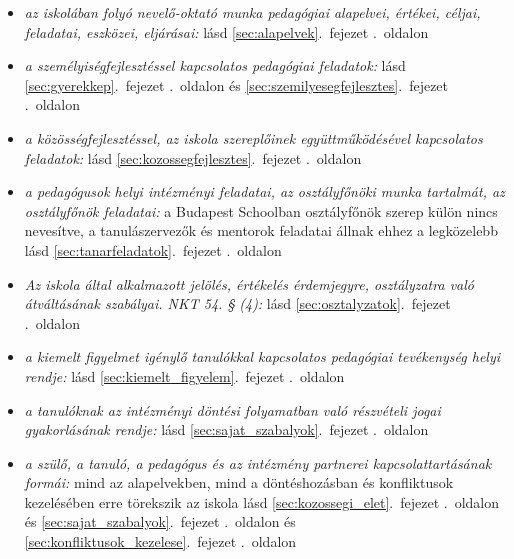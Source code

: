 \begin{itemize}
   

\item \emph{az iskolában folyó nevelő-oktató munka pedagógiai alapelvei, értékei, céljai, feladatai, eszközei, eljárásai: }    
       lásd        \ref{sec:alapelvek}.~fejezet .~oldalon
              
\item \emph{a személyiségfejlesztéssel kapcsolatos pedagógiai feladatok: }    
       lásd        \ref{sec:gyerekkep}.~fejezet .~oldalon és 
              \ref{sec:szemilyesegfejlesztes}.~fejezet .~oldalon
              
\item \emph{a közösségfejlesztéssel, az iskola szereplőinek együttműködésével kapcsolatos feladatok: }    
       lásd        \ref{sec:kozossegfejlesztes}.~fejezet .~oldalon
              
\item \emph{a pedagógusok helyi intézményi feladatai, az osztályfőnöki munka tartalmát, az osztályfőnök feladatai: }   a Budapest Schoolban osztályfőnök szerep külön nincs nevesítve, a tanulászervezők és mentorok feladatai állnak ehhez a legközelebb 
       lásd        \ref{sec:tanarfeladatok}.~fejezet .~oldalon
              
\item \emph{Az iskola által alkalmazott jelölés, értékelés érdemjegyre, osztályzatra való átváltásának szabályai. NKT 54. § (4): }    
       lásd        \ref{sec:osztalyzatok}.~fejezet .~oldalon
              
\item \emph{a kiemelt figyelmet igénylő tanulókkal kapcsolatos pedagógiai tevékenység helyi rendje: }    
       lásd        \ref{sec:kiemelt_figyelem}.~fejezet .~oldalon
              
\item \emph{a tanulóknak az intézményi döntési folyamatban való részvételi jogai gyakorlásának rendje: }    
       lásd        \ref{sec:sajat_szabalyok}.~fejezet .~oldalon
              
\item \emph{a szülő, a tanuló, a pedagógus és az intézmény partnerei kapcsolattartásának formái: }   mind az alapelvekben, mind a döntéshozásban és konfliktusok kezelésében erre törekszik az iskola 
       lásd        \ref{sec:kozossegi_elet}.~fejezet .~oldalon és 
              \ref{sec:sajat_szabalyok}.~fejezet .~oldalon és 
              \ref{sec:konfliktusok_kezelese}.~fejezet .~oldalon
              

\end{itemize}
